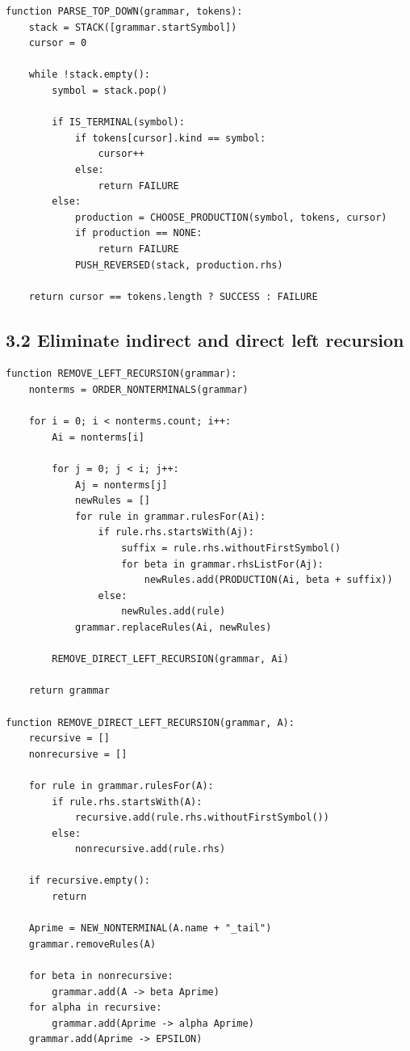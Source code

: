 \documentclass[10pt,letterpaper]{article}
\begin{document}
\begin{verbatim}
function PARSE_TOP_DOWN(grammar, tokens):
    stack = STACK([grammar.startSymbol])
    cursor = 0

    while !stack.empty():
        symbol = stack.pop()

        if IS_TERMINAL(symbol):
            if tokens[cursor].kind == symbol:
                cursor++
            else:
                return FAILURE
        else:
            production = CHOOSE_PRODUCTION(symbol, tokens, cursor)
            if production == NONE:
                return FAILURE
            PUSH_REVERSED(stack, production.rhs)

    return cursor == tokens.length ? SUCCESS : FAILURE
\end{verbatim}

\subsection*{3.2 Eliminate indirect and direct left recursion}
{}

\begin{verbatim}
function REMOVE_LEFT_RECURSION(grammar):
    nonterms = ORDER_NONTERMINALS(grammar)

    for i = 0; i < nonterms.count; i++:
        Ai = nonterms[i]

        for j = 0; j < i; j++:
            Aj = nonterms[j]
            newRules = []
            for rule in grammar.rulesFor(Ai):
                if rule.rhs.startsWith(Aj):
                    suffix = rule.rhs.withoutFirstSymbol()
                    for beta in grammar.rhsListFor(Aj):
                        newRules.add(PRODUCTION(Ai, beta + suffix))
                else:
                    newRules.add(rule)
            grammar.replaceRules(Ai, newRules)

        REMOVE_DIRECT_LEFT_RECURSION(grammar, Ai)

    return grammar

function REMOVE_DIRECT_LEFT_RECURSION(grammar, A):
    recursive = []
    nonrecursive = []

    for rule in grammar.rulesFor(A):
        if rule.rhs.startsWith(A):
            recursive.add(rule.rhs.withoutFirstSymbol())
        else:
            nonrecursive.add(rule.rhs)

    if recursive.empty():
        return

    Aprime = NEW_NONTERMINAL(A.name + "_tail")
    grammar.removeRules(A)

    for beta in nonrecursive:
        grammar.add(A -> beta Aprime)
    for alpha in recursive:
        grammar.add(Aprime -> alpha Aprime)
    grammar.add(Aprime -> EPSILON)
\end{verbatim}
\end{document}
